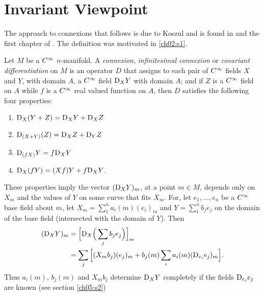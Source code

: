 \documentclass[../main]{subfiles}
\begin{document}
\section{Invariant Viewpoint}\label{ch05:s1}
The approach to connexions that follows is due to Koszul and is found in \cite{kobayashi1963foundations} %
and the first chapter of \cite{helgason2012differential}. The definition was motivated in \ref{ch02:s1}.

Let $M$ be a $C^\infty$ $n$-manifold. A \emph{connexion}, \emph{infinitesimal connexion} or \emph{covariant differentiation} on $M$ is an operator $D$ that assigns to each pair of $C^\infty$ fields $X$ and $Y$, with domain $A$, a $C^\infty$ field $\mathrm{D}_X Y$ with domain $A$; and if $Z$ is a $C^\infty$ field on $A$ while $f$ is a $C^\infty$ real valued function on $A$, then $D$ satisfies the following four properties:
\begin{enumerate}[label=(\arabic*)]

    
    \item\label{eqn:ch5.1.1} $\mathrm{D}_X(Y+Z) = \mathrm{D}_X Y + \mathrm{D}_X Z$
    
    \item\label{eqn:ch5.1.2} $\mathrm{D}_{(X+Y)}(Z) = \mathrm{D}_X Z + \mathrm{D}_Y Z$
    
    \item\label{eqn:ch5.1.3} $\mathrm{D}_{(fX)} Y = f \mathrm{D}_X Y$
    
    \item\label{eqn:ch5.1.4} $\mathrm{D}_X(fY) = (Xf)Y + f\mathrm{D}_X Y$.
    
\end{enumerate}
These properties imply the vector $(\mathrm{D}_X Y)_m$, at a point $m \in M$, depends only on $X_m$ and the values of $Y$ on some curve that fits $X_m$. For, let $e_1,\dots,e_n$ be a $C^\infty$ base field about $m$, let $X_m = \displaystyle\sum_1^n a_i(m)(e_i)_m$ and $Y = \displaystyle\sum_1^n b_j e_j$ on the domain of the base field (intersected with the domain of $Y$). Then
\begin{align*}
    (\mathrm{D}_X Y)_m &= \Big[\mathrm{D}_X\Big(\sum_j b_j e_j\Big)\Big]_m \\
    &= \sum_j \Big[(X_m b_j)(e_j)_m + b_j(m)\sum_i a_i(m)(\mathrm{D}_{e_i}e_j)_m\Big].
\end{align*}
Thus $a_i(m)$, $b_j(m)$ and $X_m b_j$ determine $\mathrm{D}_X Y$ completely if the fields $\mathrm{D}_{e_i}e_j$ are known (see section \ref{ch05:s2})
\end{document}
